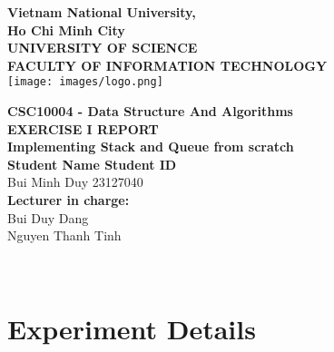 \documentclass[a4paper, 12pt]{article}
\begin{document}
\begin{titlepage}
  \begin{center}
    \textbf{\LARGE Vietnam National University,}\\[0.5cm]
    \textbf{\LARGE Ho Chi Minh City}\\[0.5cm]
    \vspace{20pt}
    \textbf{\large UNIVERSITY OF SCIENCE}\\[0.2cm]
    \textbf{\large FACULTY OF INFORMATION TECHNOLOGY}\\[0.2cm]
    \vspace{20pt}
    \texttt{[image: images/logo.png]}

    \par
    \vspace{20pt}
    \textbf{\Large CSC10004 - Data Structure And Algorithms}\\
    \vspace{15pt}
    \myrule[1pt][7pt]
    \textbf{\LARGE EXERCISE I REPORT}\\
    \vspace{15pt}
    \textbf{\large Implementing Stack and Queue from scratch}\\
    \vspace{10pt}
    \myrule[1pt][7pt]
    \vspace{25pt}
    \textbf{\large Student Name \hspace{20pt} Student ID}\\
    Bui Minh Duy \hspace{45pt} 23127040 \\

    \vspace{45pt}
    \textbf {\large Lecturer in charge:}\\[0.2cm]
    \Large {Bui Duy Dang}\\[0.1cm]
    \Large {Nguyen Thanh Tinh}\\[0.1cm]
  \end{center}

  \par
  \vfill
  \begin{center}
    \\
  \end{center}

\end{titlepage}

\tableofcontents\thispagestyle{empty}

\pagebreak
\section{Experiment Details}


\end{document}
